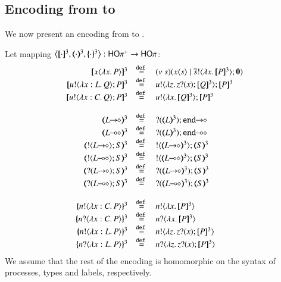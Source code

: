 \subsection{Encoding from \HOpp to \HOp}

We now present an encoding from \HOpp to \HOp.

\begin{definition}\rm
	\label{def:enc:HOpp_to_HOp}
	Let mapping $\enco{\pmap{\cdot}{3}, \tmap{\cdot}{3}, \mapa{\cdot}^{3}}: \HOpp \to \HOp$:
%
	\[
	\begin{array}{rcl}
		\pmap{\appl{x}{\abs{x} P}}{3} &\defeq& \newsp{s}{\appl{x}{s} \Par \bout{\dual{s}}{\abs{x} \pmap{P}{3}} \inact}
		\\
		\pmap{\bout{u}{\abs{x: L}{Q}} P}{3} &\defeq& \bout{u}{\abs{z}{\binp{z}{x} \pmap{Q}{3}}} \pmap{P}{3}
		\\
		\pmap{\bout{u}{\abs{x: C}{Q}} P}{3} &\defeq& \bout{u}{\abs{x}{\pmap{Q}{3}}} \pmap{P}{3}
		\\
		\\
		\tmap{\shot{L}}{3} &\defeq& \shot{\btinp{\tmap{L}{3}} \tinact}
		\\
		\tmap{\lhot{L}}{3} &\defeq& \lhot{\btinp{\tmap{L}{3}} \tinact}
		\\
		\tmap{\btout{\shot{L}} S}{3} &\defeq& \btout{\tmap{\shot{L}}{3}} \tmap{S}{3}
		\\
		\tmap{\btout{\lhot{L}} S}{3} &\defeq& \btout{\tmap{\lhot{L}}{3}} \tmap{S}{3}
		\\
		\tmap{\btinp{\shot{L}} S}{3} &\defeq& \btinp{\tmap{\shot{L}}{3}} \tmap{S}{3}
		\\
		\tmap{\btinp{\lhot{L}} S}{3} &\defeq& \btinp{\tmap{\lhot{L}}{3}} \tmap{S}{3}
		\\
		\\
		\mapa{\bactout{n}{\abs{x:C}{P}}}^{3} &\defeq& \bactout{n}{\abs{x}{\pmap{P}{3}}}
		\\
		\mapa{\bactinp{n}{\abs{x:C}{P}}}^{3} &\defeq& \bactinp{n}{\abs{x}{\pmap{P}{3}}}
		\\
		\mapa{\bactout{n}{\abs{x:L}{P}}}^{3} &\defeq& \bactout{n}{\abs{z}{\binp{z}{x} \pmap{P}{3}}}
		\\
		\mapa{\bactinp{n}{\abs{x:L}{P}}}^{3} &\defeq& \bactinp{n}{\abs{z}{\binp{z}{x} \pmap{P}{3}}}

	\end{array}
	\]
%
	\noi We assume that the rest of the encoding is homomorphic on the syntax of
	processes, types and labels, respectively.
\end{definition}

